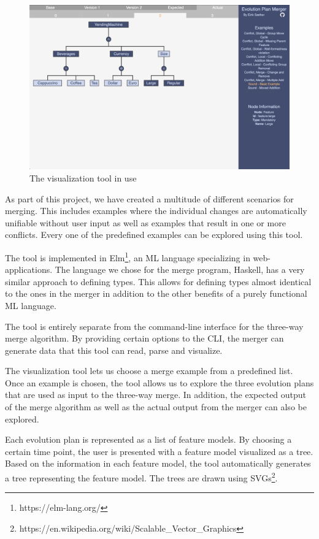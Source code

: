 \documentclass[a4paper,english]{ifimaster}
\begin{document}
\begin{figure}[htpb]
  \centering
  \includegraphics[width=\linewidth]{vending_machine/sound_example.png}
  \caption{The visualization tool in use}%
  \label{fig:visualization_tool_in_use}
\end{figure}

As part of this project, we have created a multitude of different scenarios for merging. This includes examples where the individual changes are automatically unifiable without user input as well as examples that result in one or more conflicts. Every one of the predefined examples can be explored using this tool. 

The tool is implemented in Elm\footnote{https://elm-lang.org/}, an ML language specializing in web-applications. The language we chose for the merge program, Haskell, has a very similar approach to defining types. This allows for defining types almost identical to the ones in the merger in addition to the other benefits of a purely functional ML language.

The tool is entirely separate from the command-line interface for the three-way merge algorithm. By providing certain options to the CLI, the merger can generate data that this tool can read, parse and visualize.

The visualization tool lets us choose a merge example from a predefined list. Once an example is chosen, the tool allows us to explore the three evolution plans that are used as input to the three-way merge. In addition, the expected output of the merge algorithm as well as the actual output from the merger can also be explored.

Each evolution plan is represented as a list of feature models. By choosing a certain time point, the user is presented with a feature model visualized as a tree. Based on the information in each feature model, the tool automatically generates a tree representing the feature model. The trees are drawn using SVGs\footnote{https://en.wikipedia.org/wiki/Scalable\_Vector\_Graphics}.
\end{document}
